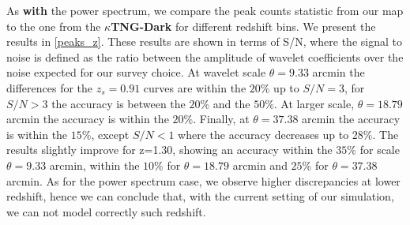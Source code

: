 \documentclass{aa}
\begin{document}
As \textbf{with} the power spectrum, we compare the peak counts statistic from our map to the one from the \textbf{$\kappa$TNG-Dark} for different redshift bins. We present the results in \autoref{peaks_z}. These results are shown in terms of S/N, where the signal to noise is defined as the ratio between the amplitude of wavelet coefficients over the noise expected for our survey choice.
At wavelet scale $\theta=9.33$ arcmin the differences for the $z_s=0.91$ curves are within the $20\%$ up to $S/N=3$, for $S/N>3$ the accuracy is between the $20\%$ and the $50\%$. At larger scale, $\theta=18.79$ arcmin the accuracy is within the $20\%$. Finally, at $\theta=37.38$ arcmin the accuracy is within the $15\%$, except $S/N<1$ where the accuracy decreases up to $28\%$.
The results slightly improve for z=1.30, showing an accuracy within the $35\%$ for scale $\theta=9.33$ arcmin,  within the $10\%$ for $\theta=18.79$ arcmin and $25\%$ for $\theta=37.38$ arcmin.
 As for the power spectrum case, we observe higher discrepancies at lower redshift, hence we can conclude that, with the current setting of our simulation, we can not model correctly such redshift.
\end{document}
